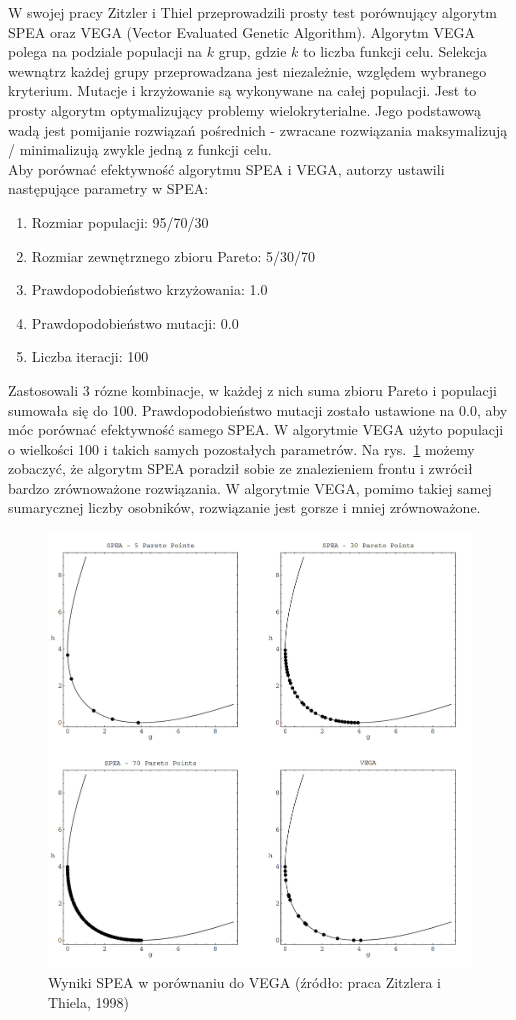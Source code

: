 \documentclass[a4paper]{article}
\begin{document}
W swojej pracy Zitzler i Thiel przeprowadzili prosty test porównujący algorytm SPEA oraz VEGA (Vector Evaluated Genetic Algorithm). Algorytm VEGA polega na podziale populacji na $k$ grup, gdzie $k$ to liczba funkcji celu. Selekcja wewnątrz każdej grupy przeprowadzana jest niezależnie, względem wybranego kryterium. Mutacje i krzyżowanie są wykonywane na całej populacji. Jest to prosty algorytm optymalizujący problemy wielokryterialne. Jego podstawową wadą jest pomijanie rozwiązań pośrednich - zwracane rozwiązania maksymalizują / minimalizują zwykle jedną z funkcji celu. \\
Aby porównać efektywność algorytmu SPEA i VEGA, autorzy ustawili następujące parametry w SPEA:
\newpage
\begin{enumerate}
\item Rozmiar populacji: 95/70/30
\item Rozmiar zewnętrznego zbioru Pareto: 5/30/70
\item Prawdopodobieństwo krzyżowania: 1.0
\item Prawdopodobieństwo mutacji: 0.0
\item Liczba iteracji: 100
\end{enumerate}
Zastosowali 3 rózne kombinacje, w każdej z nich suma zbioru Pareto i populacji sumowała się do 100. Prawdopodobieństwo mutacji zostało ustawione na 0.0, aby móc porównać efektywność samego SPEA. W algorytmie VEGA użyto populacji o wielkości 100 i takich samych pozostałych parametrów. Na rys.~\ref{fig:performance} możemy zobaczyć, że algorytm SPEA poradził sobie ze znalezieniem frontu i zwrócił bardzo zrównoważone rozwiązania. W algorytmie VEGA, pomimo takiej samej sumarycznej liczby osobników, rozwiązanie jest gorsze i mniej zrównoważone.
\begin{figure}[htbp]{}
\centerline{\includegraphics[scale=.30]{performance.png}}
\caption{Wyniki SPEA w porównaniu do VEGA (źródło: praca Zitzlera i Thiela, 1998)}
\label{fig:performance}
\end{figure}
\end{document}
